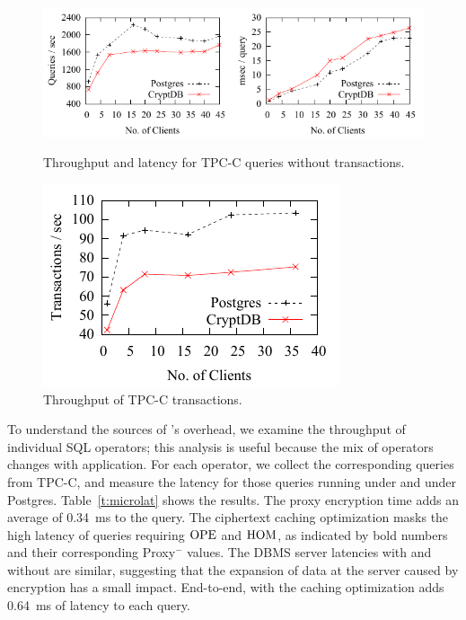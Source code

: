 \begin{figure}[t!]
\begin{minipage}[t]{4.4in}
\centering
\includegraphics{fig/queries.pdf}
\caption{Throughput and latency for TPC-C queries without transactions.}
\label{fig:querytputlat}
\end{minipage}
\begin{minipage}[t]{2.2in}
\centering
\includegraphics{fig/trantput.pdf}
\caption{Throughput of TPC-C transactions.}
\label{fig:trantput}
\end{minipage}
\end{figure}


To understand the sources of \name's overhead, we examine the
throughput of individual SQL operators; this analysis is useful
because the mix of operators changes with application.  For each
operator, we collect the corresponding queries from TPC-C, and
measure the latency for those queries running under \name and under
Postgres.  Table~\ref{t:microlat} shows the results.
The proxy encryption time adds an average of 0.34~ms to the query.
The ciphertext caching optimization masks the high latency of queries
requiring $\textrm{OPE}$ and $\textrm{HOM}$, as indicated by bold numbers and their
corresponding Proxy$^-$ values.
The DBMS server latencies with and without \name are similar,
suggesting that the expansion of data at the server caused by encryption has a small
impact.
End-to-end, \name with the caching optimization adds
0.64~ms of latency to each query.

